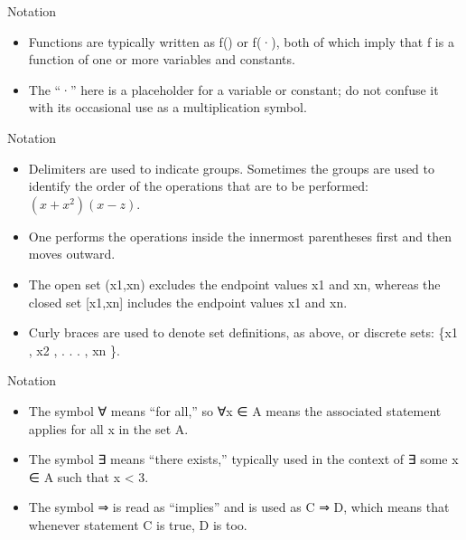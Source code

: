 \documentclass[
  ignorenonframetext,
]{beamer}
\begin{document}
\begin{frame}{Notation}
\protect\hypertarget{notation-4}{}

\begin{itemize}
\item
  Functions are typically written as f() or f(·), both of which imply
  that f is a function of one or more variables and constants.
\item
  The ``·'' here is a placeholder for a variable or constant; do not
  confuse it with its occasional use as a multiplication symbol.
\end{itemize}

\end{frame}

\begin{frame}{Notation}
\protect\hypertarget{notation-5}{}

\begin{itemize}
\item
  Delimiters are used to indicate groups. Sometimes the groups are used
  to identify the order of the operations that are to be performed:
  \((x + x^{2})(x − z)\).
\item
  One performs the operations inside the innermost parentheses first and
  then moves outward.
\item
  The open set (x1,xn) excludes the endpoint values x1 and xn, whereas
  the closed set {[}x1,xn{]} includes the endpoint values x1 and xn.
\item
  Curly braces are used to denote set definitions, as above, or discrete
  sets: \{x1 , x2 , . . . , xn \}.
\end{itemize}

\end{frame}

\begin{frame}{Notation}
\protect\hypertarget{notation-6}{}

\begin{itemize}
\item
  The symbol ∀ means ``for all,'' so ∀x ∈ A means the associated
  statement applies for all x in the set A.
\item
  The symbol ∃ means ``there exists,'' typically used in the context of
  ∃ some x ∈ A such that x \textless{} 3.
\item
  The symbol ⇒ is read as ``implies'' and is used as C ⇒ D, which means
  that whenever statement C is true, D is too.
\end{itemize}

\end{frame}
\end{document}
